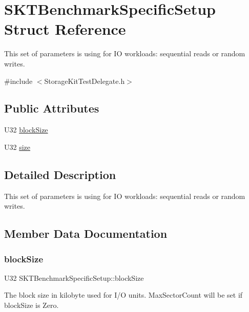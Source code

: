 \hypertarget{struct_s_k_t_benchmark_specific_setup}{}\section{S\+K\+T\+Benchmark\+Specific\+Setup Struct Reference}
\label{struct_s_k_t_benchmark_specific_setup}


This set of parameters is using for IO workloads\+: sequential reads or random writes.  




{\ttfamily \#include $<$Storage\+Kit\+Test\+Delegate.\+h$>$}

\subsection*{Public Attributes}
\begin{DoxyCompactItemize}
\item 
U32 \mbox{\hyperlink{struct_s_k_t_benchmark_specific_setup_a5b2f5132006c8f6db53707cacb930f42}{block\+Size}}
\item 
U32 \mbox{\hyperlink{struct_s_k_t_benchmark_specific_setup_af9dc87ac55eae270f965531892bf7d12}{size}}
\end{DoxyCompactItemize}


\subsection{Detailed Description}
This set of parameters is using for IO workloads\+: sequential reads or random writes. 

\subsection{Member Data Documentation}
\mbox{\label{struct_s_k_t_benchmark_specific_setup_a5b2f5132006c8f6db53707cacb930f42}} 
\subsubsection{\texorpdfstring{blockSize}{blockSize}}
{\footnotesize\ttfamily U32 S\+K\+T\+Benchmark\+Specific\+Setup\+::block\+Size}

The block size in kilobyte used for I/O units. Max\+Sector\+Count will be set if block\+Size is Zero. \mbox{\label{struct_s_k_t_benchmark_specific_setup_af9dc87ac55eae270f965531892bf7d12}} 

